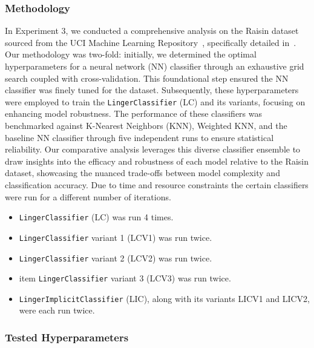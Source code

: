 \documentclass[a4paper, 12pt]{report}
\begin{document}
\subsubsection{Methodology}
In Experiment 3, we conducted a comprehensive analysis on the Raisin dataset sourced from the UCI Machine Learning Repository~\cite{uciDatasets}, 
specifically detailed in~\cite{misc_raisin_850}. Our methodology was two-fold: initially, we determined the optimal hyperparameters for a neural network (NN) classifier 
through an exhaustive grid search coupled with cross-validation. This foundational step ensured the NN classifier was finely tuned for the dataset. 
Subsequently, these hyperparameters were employed to train the \texttt{LingerClassifier} (LC) and its variants, focusing on enhancing model robustness. 
The performance of these classifiers was benchmarked against K-Nearest Neighbors (KNN), Weighted KNN, and the baseline NN classifier through five independent
 runs to ensure statistical reliability. Our comparative analysis leverages this diverse classifier ensemble to draw insights into the efficacy and robustness of 
 each model relative to the Raisin dataset, showcasing the nuanced trade-offs between model complexity and classification accuracy.
 Due to time and resource constraints the certain classifiers were run for a different number of iterations.
\begin{itemize}
    \item \texttt{LingerClassifier} (LC) was run 4 times.
    \item \texttt{LingerClassifier} variant 1 (LCV1) was run twice.
    \item \texttt{LingerClassifier} variant 2 (LCV2) was run twice.
    \item item \texttt{LingerClassifier} variant 3 (LCV3) was run twice.
    \item \texttt{LingerImplicitClassifier} (LIC), along with its variants LICV1 and LICV2, were each run twice.
\end{itemize}

\subsubsection{Tested Hyperparameters}
\end{document}
